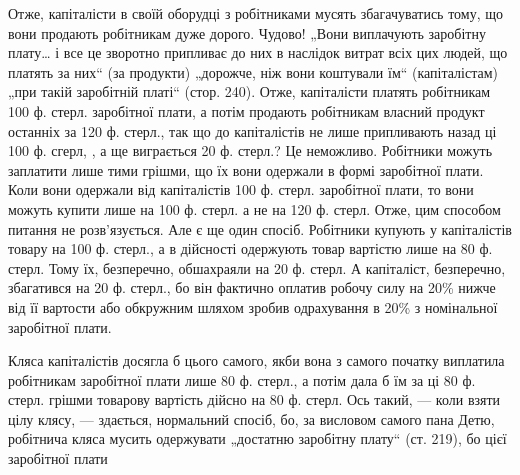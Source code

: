 Отже, капіталісти в своїй оборудці з робітниками мусять збагачуватись
тому, що вони продають робітникам дуже дорого. Чудово! „Вони
виплачують заробітну плату\dots{} і все це зворотно припливає до них в наслідок
витрат всіх цих людей, що платять за них“ (за продукти) „дорожче,
ніж вони коштували їм“ (капіталістам) „при такій заробітній
платі“ (стор. 240). Отже, капіталісти платять робітникам 100 ф.
стерл. заробітної плати, а потім продають робітникам власний продукт
останніх за 120 ф. стерл., так що до капіталістів не лише припливають
назад ці 100 ф. сгерл, , а ще виграється 20 ф. стерл.? Це неможливо.
Робітники можуть заплатити лише тими грішми, що їх вони одержали
в формі заробітної плати. Коли вони одержали від капіталістів 100 ф.
стерл. заробітної плати, то вони можуть купити лише на 100 ф. стерл.
а не на 120 ф. стерл. Отже, цим способом питання не розв’язується. Але
є ще один спосіб. Робітники купують у капіталістів товару на 100 ф.
стерл., а в дійсності одержують товар вартістю лише на 80 ф. стерл.
Тому їх, безперечно, обшахраяли на 20 ф. стерл. А капіталіст, безперечно,
збагатився на 20 ф. стерл., бо він фактично оплатив робочу силу
на 20\% нижче від її вартости або обкружним шляхом зробив одрахування
в 20\% з номінальної заробітної плати.

Кляса капіталістів досягла б цього самого, якби вона з самого початку
виплатила робітникам заробітної плати лише 80 ф. стерл., а потім
дала б їм за ці 80 ф. стерл. грішми товарову вартість дійсно на 80 ф.
стерл. Ось такий, — коли взяти цілу клясу, — здається, нормальний спосіб,
бо, за висловом самого пана Детю, робітнича кляса мусить одержувати
„достатню заробітну плату“ (ст. 219), бо цієї заробітної плати
\parbreak{}  %
